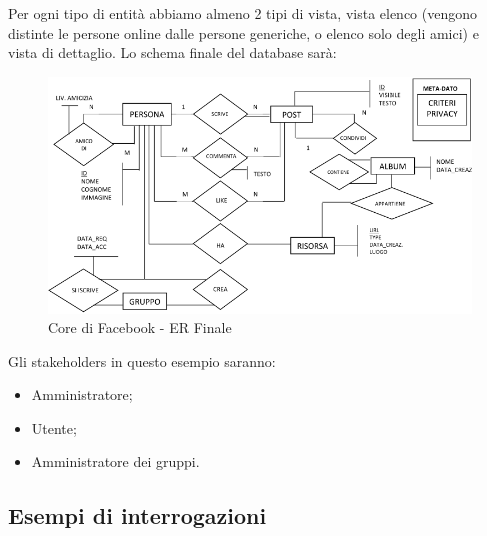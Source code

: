 Per ogni tipo di entità abbiamo almeno 2 tipi di vista, vista elenco (vengono distinte le persone online dalle persone generiche, o elenco solo degli amici) e vista di dettaglio. Lo schema finale del database sarà: 

\begin{center}
\begin{figure}[H]
\centering
\includegraphics[scale=0.7]{figures/facebook.png}
\caption{Core di Facebook - ER Finale}
\end{figure}
\end{center}

Gli stakeholders in questo esempio saranno:

\begin{itemize}
\item Amministratore;
\item Utente;
\item Amministratore dei gruppi.   
\end{itemize}

\subsection{Esempi di interrogazioni}

